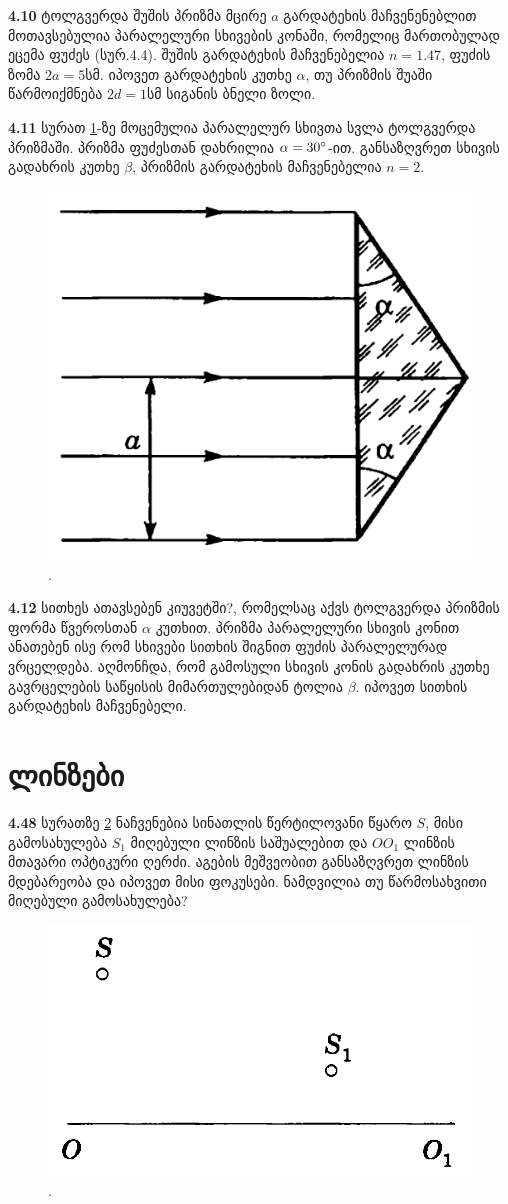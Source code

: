 \documentclass[a4paper]{book}
\begin{document}
\textbf{4.10} ტოლგვერდა შუშის პრიზმა მცირე $a$ გარდატეხის მაჩვენენებლით მოთავსებულია პარალელური სხივების კონაში, რომელიც მართობულად ეცემა ფუძეს (სურ.4.4). შუშის გარდატეხის მაჩვენებელია $n=1.47$, ფუძის ზომა $2a=5 სმ$. იპოვეთ გარდატეხის კუთხე $\alpha$, თუ პრიზმის შუაში წარმოიქმნება $2d=1სმ $ სიგანის ბნელი ზოლი.

\textbf{4.11} სურათ \ref{fig:4_11}-ზე მოცემულია პარალელურ სხივთა სვლა ტოლგვერდა პრიზმაში. პრიზმა ფუძესთან დახრილია $\alpha = 30 \degree$-ით. განსაზღვრეთ სხივის გადახრის კუთხე $\beta$, პრიზმის გარდატეხის მაჩვენებელია $n = 2$.
	\begin{figure}[h]
		   \centering
           \includegraphics[width=0.4\columnwidth]{figures/4_11}
           \caption{.}
           \label{fig:4_11}
        \end{figure}

\textbf{4.12} სითხეს ათავსებენ კიუვეტში?, რომელსაც აქვს ტოლგვერდა პრიზმის ფორმა წვეროსთან $\alpha$ კუთხით. პრიზმა პარალელური სხივის კონით ანათებენ ისე რომ სხივები სითხის შიგნით ფუძის პარალელურად ვრცელდება. აღმონჩდა, რომ გამოსული სხივის კონის გადახრის კუთხე გავრცელების საწყისის მიმართულებიდან ტოლია $\beta$. იპოვეთ სითხის გარდატეხის მაჩვენებელი. 

\section{ლინზები}

\textbf{4.48} სურათზე \ref{fig:4_48} ნაჩვენებია სინათლის წერტილოვანი წყარო $S$, მისი გამოსახულება $S_1$ მიღებული ლინზის საშუალებით და $OO_1$ ლინზის მთავარი ოპტიკური ღერძი. აგების მეშვეობით განსაზღვრეთ ლინზის მდებარეობა და იპოვეთ მისი ფოკუსები. ნამდვილია თუ წარმოსახვითი მიღებული გამოსახულება?
	\begin{figure}[h]
		   \centering
           \includegraphics[width=0.4\columnwidth]{figures/4_48}
           \caption{.}
           \label{fig:4_48}
        \end{figure}
\end{document}
